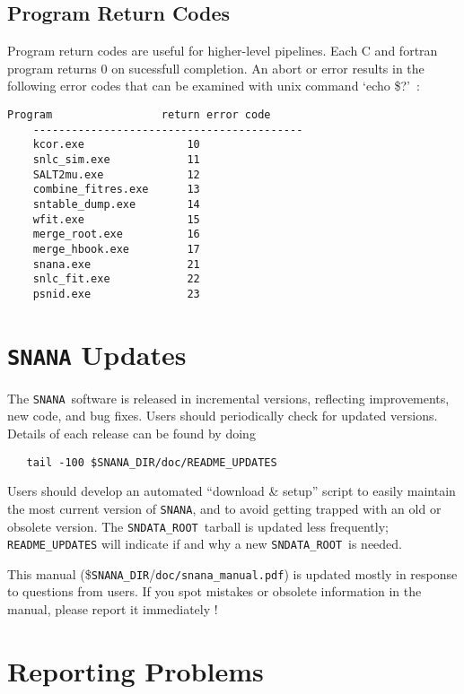\documentclass[12pt]{article}
\newcommand{\snana}{{\tt SNANA}}
\newcommand{\snanadir}{{\tt SNANA\_DIR}}
\newcommand{\sndataroot}{{\tt SNDATA\_ROOT}}
\begin{document}
  \subsection{ Program Return Codes }
  \label{subsec:return_codes}

Program return codes are useful for higher-level pipelines.
Each C and fortran program returns 0 on sucessfull completion.
An abort or error results in the following error codes that
can be examined with unix command `echo \$?'~:
%
\begin{Verbatim}[frame=single]
    Program                 return error code
    ------------------------------------------
    kcor.exe                10
    snlc_sim.exe            11
    SALT2mu.exe             12  
    combine_fitres.exe      13
    sntable_dump.exe        14
    wfit.exe                15
    merge_root.exe          16
    merge_hbook.exe         17
    snana.exe               21
    snlc_fit.exe            22
    psnid.exe               23
\end{Verbatim}


   \clearpage
   \section{{\tt SNANA} Updates}
   \label{sec:snana_updates}

The \snana\ software is released in incremental versions,
reflecting improvements, new code, and bug fixes.
Users should periodically check for updated versions.
Details of each release can be found by doing
%
\begin{verbatim}
   tail -100 $SNANA_DIR/doc/README_UPDATES
\end{verbatim}
%
Users should develop an automated ``download \& setup'' 
script to easily maintain the most current version of 
\snana, and to avoid getting trapped with an old or 
obsolete version.  The \sndataroot\ tarball 
is updated less frequently; {\tt README\_UPDATES} will indicate
if and why a new \sndataroot\ is needed.

This manual (\$\snanadir/{\tt doc/snana\_manual.pdf})
is updated mostly in response to questions from users.
If you spot mistakes or obsolete information
in the manual, please report it immediately !


   \section{Reporting Problems}
   \label{sec:problems}
\end{document}
